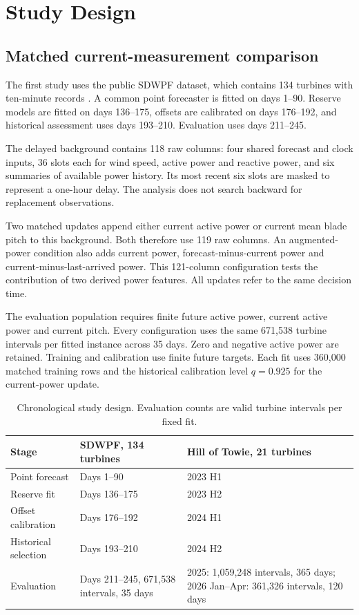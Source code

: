 \section{Study Design}
\label{sec:design}

\subsection{Matched current-measurement comparison}
The first study uses the public SDWPF dataset, which contains 134 turbines with ten-minute records \cite{zhou2024sdwpfdata}. A common point forecaster is fitted on days 1--90. Reserve models are fitted on days 136--175, offsets are calibrated on days 176--192, and historical assessment uses days 193--210. Evaluation uses days 211--245.

The delayed background contains 118 raw columns: four shared forecast and clock inputs, 36 slots each for wind speed, active power and reactive power, and six summaries of available power history. Its most recent six slots are masked to represent a one-hour delay. The analysis does not search backward for replacement observations.

Two matched updates append either current active power or current mean blade pitch to this background. Both therefore use 119 raw columns. An augmented-power condition also adds current power, forecast-minus-current power and current-minus-last-arrived power. This 121-column configuration tests the contribution of two derived power features. All updates refer to the same decision time.

The evaluation population requires finite future active power, current active power and current pitch. Every configuration uses the same 671,538 turbine intervals per fitted instance across 35 days. Zero and negative active power are retained. Training and calibration use finite future targets. Each fit uses 360,000 matched training rows and the historical calibration level $q=0.925$ for the current-power update.

\begin{table}[!t]
\caption{Chronological study design. Evaluation counts are valid turbine intervals per fixed fit.}
\label{tab:design}
\centering
\footnotesize
\begin{tabularx}{\columnwidth}{lXX}
\toprule
Stage & SDWPF, 134 turbines & Hill of Towie, 21 turbines \\
\midrule
Point forecast & Days 1--90 & 2023 H1 \\
Reserve fit & Days 136--175 & 2023 H2 \\
Offset calibration & Days 176--192 & 2024 H1 \\
Historical selection & Days 193--210 & 2024 H2 \\
Evaluation & Days 211--245, 671,538 intervals, 35 days & 2025: 1,059,248 intervals, 365 days; 2026 Jan--Apr: 361,326 intervals, 120 days \\
\bottomrule
\end{tabularx}
\end{table}

